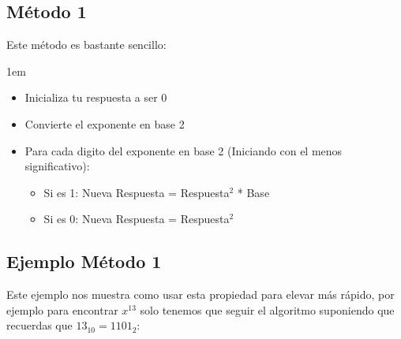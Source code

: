 \documentclass[12pt, fleqn]{report}                             %
\newenvironment{SmallIndentation}[1][0.75em]                    %
    {\begin{adjustwidth}{#1}{}\begin{footnotesize}}                 %
    {\end{footnotesize}\end{adjustwidth}}                           %
\begin{document}
        \subsection*{Método 1}

            Este método es bastante sencillo:

            \begin{SmallIndentation}[1em]
                
                \begin{itemize}
                    \item   Inicializa tu respuesta a ser 0
                    \item   Convierte el exponente en base 2

                    \item Para cada digito del exponente en base 2 (Iniciando con
                          el menos significativo):
                        
                        \begin{itemize}
                            \item Si es 1: Nueva Respuesta = Respuesta$^2$ * Base 
                            \item Si es 0: Nueva Respuesta = Respuesta$^2$ 
                        \end{itemize}
                \end{itemize}

            \end{SmallIndentation}


            


        \subsection*{Ejemplo Método 1}



            Este ejemplo nos muestra como usar esta propiedad para elevar más rápido, por ejemplo para encontrar
            $x^{13}$ solo tenemos que seguir el algoritmo suponiendo que recuerdas que $13_{10} = 1101_{2}$:
\end{document}
